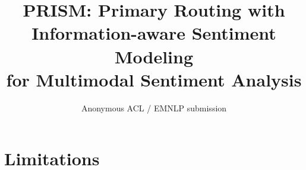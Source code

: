 \documentclass[11pt]{article}
\title{PRISM: Primary Routing with Information-aware Sentiment Modeling\\
  for Multimodal Sentiment Analysis}
\author{Anonymous ACL / EMNLP submission}
\begin{document}
\maketitle
\begin{abstract}

\end{abstract}







\section{Limitations}
\label{sec:limitations}




\end{document}
